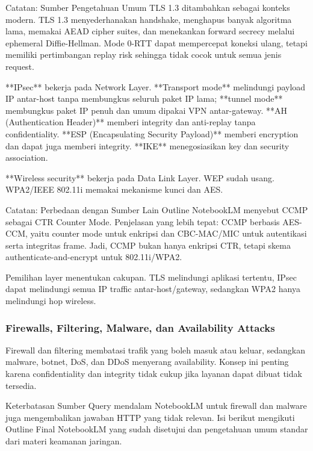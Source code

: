 \begin{cmt}{Catatan: Sumber Pengetahuan Umum}{}
TLS 1.3 ditambahkan sebagai konteks modern. TLS 1.3 menyederhanakan handshake, menghapus banyak algoritma lama, memakai AEAD cipher suites, dan menekankan forward secrecy melalui ephemeral Diffie-Hellman. Mode 0-RTT dapat mempercepat koneksi ulang, tetapi memiliki pertimbangan replay risk sehingga tidak cocok untuk semua jenis request.
\end{cmt}

**IPsec** bekerja pada Network Layer. **Transport mode** melindungi payload IP antar-host tanpa membungkus seluruh paket IP lama; **tunnel mode** membungkus paket IP penuh dan umum dipakai VPN antar-gateway. **AH (Authentication Header)** memberi integrity dan anti-replay tanpa confidentiality. **ESP (Encapsulating Security Payload)** memberi encryption dan dapat juga memberi integrity. **IKE** menegosiasikan key dan security association.

**Wireless security** bekerja pada Data Link Layer. WEP sudah usang. WPA2/IEEE 802.11i memakai mekanisme kunci dan AES. 

\begin{cmt}{Catatan: Perbedaan dengan Sumber Lain}{}
Outline NotebookLM menyebut CCMP sebagai CTR Counter Mode. Penjelasan yang lebih tepat: CCMP berbasis AES-CCM, yaitu counter mode untuk enkripsi dan CBC-MAC/MIC untuk autentikasi serta integritas frame. Jadi, CCMP bukan hanya enkripsi CTR, tetapi skema authenticate-and-encrypt untuk 802.11i/WPA2.
\end{cmt}

Pemilihan layer menentukan cakupan. TLS melindungi aplikasi tertentu, IPsec dapat melindungi semua IP traffic antar-host/gateway, sedangkan WPA2 hanya melindungi hop wireless.

\subsubsection{Firewalls, Filtering, Malware, dan Availability Attacks}
\begin{jawab}
Firewall dan filtering membatasi trafik yang boleh masuk atau keluar, sedangkan malware, botnet, DoS, dan DDoS menyerang availability. Konsep ini penting karena confidentiality dan integrity tidak cukup jika layanan dapat dibuat tidak tersedia.
\end{jawab}

\begin{cmt}{Keterbatasan Sumber}{}
Query mendalam NotebookLM untuk firewall dan malware juga mengembalikan jawaban HTTP yang tidak relevan. Isi berikut mengikuti Outline Final NotebookLM yang sudah disetujui dan pengetahuan umum standar dari materi keamanan jaringan.
\end{cmt}

